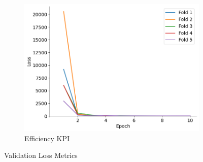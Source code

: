 \documentclass{report} %
\begin{document}
\begin{figure}[H]
\begin{subfigure}{0.32\textwidth}
        \centering
        \includegraphics[width=\textwidth]{./ReportImages/val_loss_y2.png}
        \caption{\centering Efficiency \ac{KPI}}
        \label{fig:Validation Loss for Efficiency grid}
    \end{subfigure}
    \caption{Validation Loss Metrics}
    \label{fig:Validation Loss Metrics}
\end{figure}
\end{document}
